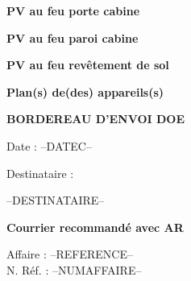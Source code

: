 \documentclass[a4paper, oneside, 10pt, french]{article}
\begin{document}
\newpage

\vspace*{10cm}

\begin{center}
\textbf{\Huge PV au feu porte cabine}
\end{center}

\newpage

\vspace*{10cm}

\begin{center}
\textbf{\Huge PV au feu paroi cabine}
\end{center}

\newpage

\vspace*{10cm}

\begin{center}
\textbf{\Huge PV au feu revêtement de sol}
\end{center}

\newpage

\vspace*{10cm}

\begin{center}
\textbf{\Huge Plan(s) de(des) appareils(s)}
\end{center}

\newpage

\normalsize

\begin{center}
\textbf{\Huge BORDEREAU D'ENVOI DOE}
\end{center}

\vspace{2cm}

\begin{minipage}[t]{0.40\textwidth}
Date : --DATEC--
\end{minipage}
\hspace{1cm}
\begin{minipage}[t]{0.52\textwidth}
{\small Destinataire :}

\begin{fminipage}
--DESTINATAIRE--\\
\begin{minipage}{\textwidth}
\flushright
\end{minipage}
\end{fminipage}
\end{minipage}

\textbf{Courrier recommandé avec AR}

Affaire : --REFERENCE--\\
N. Réf. : --NUMAFFAIRE--
\end{document}
